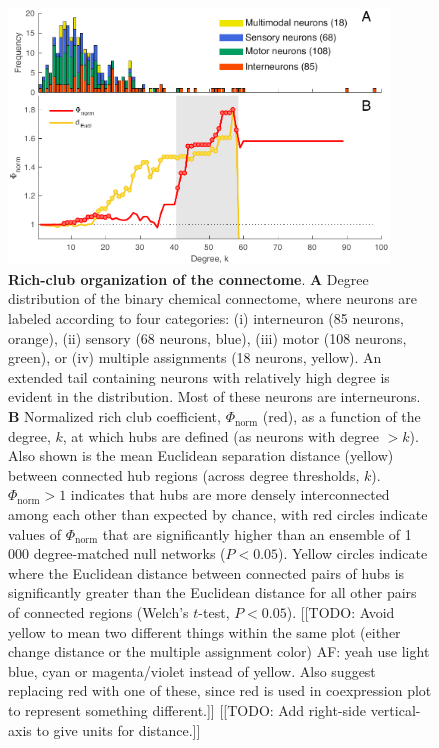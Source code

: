 \documentclass[10pt,letterpaper]{article}
\begin{document}
\begin{figure}[h]
   \centering
    \includegraphics[width=0.9\textwidth]{topology_rich.pdf}
 \caption{\textbf{Rich-club organization of the connectome}.
\textbf{A} Degree distribution of the binary chemical connectome, where neurons are labeled according to four categories:
(i) interneuron (85 neurons, orange),
(ii) sensory (68 neurons, blue),
(iii) motor (108 neurons, green), or
(iv) multiple assignments (18 neurons, yellow).
An extended tail containing neurons with relatively high degree is evident in the distribution.
Most of these neurons are interneurons.
\textbf{B}
Normalized rich club coefficient, $\Phi_\mathrm{norm}$ (red), as a function of the degree, $k$, at which hubs are defined (as neurons with degree $>k$).
Also shown is the mean Euclidean separation distance (yellow) between connected hub regions (across degree thresholds, $k$).
$\Phi_\mathrm{norm} > 1$ indicates that hubs are more densely interconnected among each other than expected by chance, with red circles indicate values of $\Phi_\mathrm{norm}$ that are significantly higher than an ensemble of 1\,000 degree-matched null networks ($P < 0.05$).
Yellow circles indicate where the Euclidean distance between connected pairs of hubs is significantly greater than the Euclidean distance for all other pairs of connected regions (Welch's $t$-test, $P < 0.05$).
[[TODO: Avoid yellow to mean two different things within the same plot (either change distance or the multiple assignment color) AF: yeah use light blue, cyan or magenta/violet instead of yellow. Also suggest replacing red with one of these, since red is used in coexpression plot to represent something different.]]
[[TODO: Add right-side vertical-axis to give units for distance.]]
}
 \label{fig:topology_rich}
 \end{figure}
\end{document}
